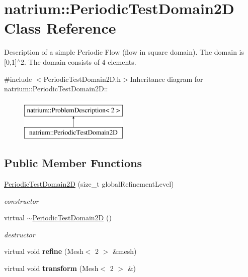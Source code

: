 \hypertarget{classnatrium_1_1PeriodicTestDomain2D}{
\section{natrium::PeriodicTestDomain2D Class Reference}
\label{classnatrium_1_1PeriodicTestDomain2D}
}


Description of a simple Periodic Flow (flow in square domain). The domain is \mbox{[}0,1\mbox{]}$^\wedge$2. The domain consists of 4 elements.  


{\ttfamily \#include $<$PeriodicTestDomain2D.h$>$}Inheritance diagram for natrium::PeriodicTestDomain2D::\begin{figure}[H]
\begin{center}
\leavevmode
\includegraphics[height=2cm]{classnatrium_1_1PeriodicTestDomain2D}
\end{center}
\end{figure}
\subsection*{Public Member Functions}
\begin{DoxyCompactItemize}
\item 
\hyperlink{classnatrium_1_1PeriodicTestDomain2D_a930da37a3e1be744aaf59e27ba956318}{PeriodicTestDomain2D} (size\_\-t globalRefinementLevel)
\begin{DoxyCompactList}\small\item\em constructor \item\end{DoxyCompactList}\item 
\hypertarget{classnatrium_1_1PeriodicTestDomain2D_a81fe3504b294cd4d6219c360f465f84b}{
virtual \hyperlink{classnatrium_1_1PeriodicTestDomain2D_a81fe3504b294cd4d6219c360f465f84b}{$\sim$PeriodicTestDomain2D} ()}
\label{classnatrium_1_1PeriodicTestDomain2D_a81fe3504b294cd4d6219c360f465f84b}

\begin{DoxyCompactList}\small\item\em destructor \item\end{DoxyCompactList}\item 
\hypertarget{classnatrium_1_1PeriodicTestDomain2D_a2585d064816ca884d12586da93388a48}{
virtual void {\bfseries refine} (Mesh$<$ 2 $>$ \&mesh)}
\label{classnatrium_1_1PeriodicTestDomain2D_a2585d064816ca884d12586da93388a48}

\item 
\hypertarget{classnatrium_1_1PeriodicTestDomain2D_a1a6e52d1a6b3f09332158ecbf19eab6e}{
virtual void {\bfseries transform} (Mesh$<$ 2 $>$ \&)}
\label{classnatrium_1_1PeriodicTestDomain2D_a1a6e52d1a6b3f09332158ecbf19eab6e}

\end{DoxyCompactItemize}


